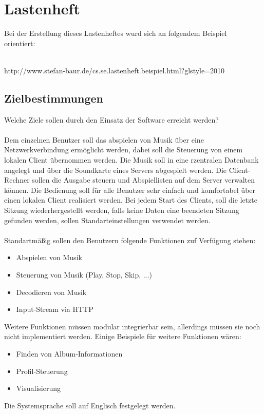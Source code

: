 \chapter{Lastenheft}
Bei der Erstellung dieses Lastenheftes wurd sich an folgendem Beispiel orientiert:\ \\ \\
\begin{center}
http://www.stefan-baur.de/cs.se.lastenheft.beispiel.html?glstyle=2010
\end{center}
\section{Zielbestimmungen}
Welche Ziele sollen durch den Einsatz der Software erreicht werden?\ \\ \\
Dem einzelnen Benutzer soll das abspielen von Musik über eine Netzwerkverbindung ermöglicht
werden, dabei soll die Steuerung von einem lokalen Client übernommen werden. Die Musik soll
in eine rzentralen Datenbank angelegt und über die Soundkarte eines Servers abgespielt werden.
Die Client-Rechner sollen die Ausgabe steuern und Abspiellisten auf dem Server verwalten
können. Die Bedienung soll für alle Benutzer sehr einfach und komfortabel über einen lokalen
Client realisiert werden. Bei jedem Start des Clients, soll die letzte Sitzung wiederhergestellt
werden, falls keine Daten eine beendeten Sitzung gefunden werden, sollen Standarteinstellungen
verwendet werden.\ \\ \\
Standartmäßig sollen den Benutzern folgende Funktionen zuf Verfügung stehen:
\renewcommand{\labelitemi}{•}
\begin{itemize}
        \item Abspielen von Musik
        \item Steuerung von Musik (Play, Stop, Skip, ...)
        \item Decodieren von Musik
        \item Input-Stream via HTTP
\end{itemize}
Weitere Funktionen müssen modular integrierbar sein, allerdings müssen sie noch nicht implementiert
werden. Einige Beispiele für weitere Funktionen wären:
\begin{itemize}
	\item Finden von Album-Informationen
	\item Profil-Steuerung
	\item Visualisierung
\end{itemize}
Die Systemsprache soll auf Englisch festgelegt werden.
